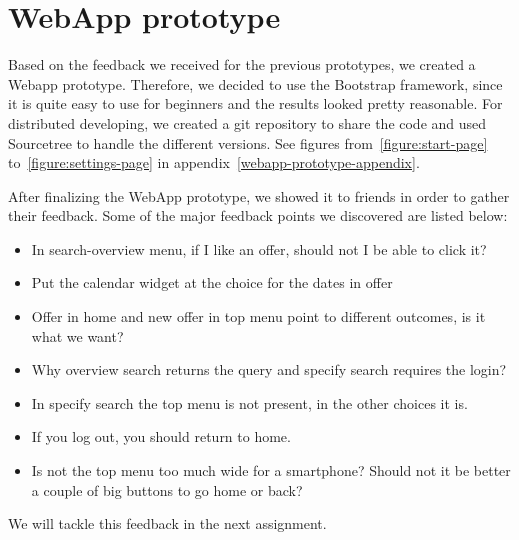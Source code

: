 \documentclass[11pt,twoside,a4paper]{report}
\begin{document}
\section{WebApp prototype}

Based on the feedback we received for the previous prototypes, we created a Webapp prototype. Therefore, we decided to use the Bootstrap framework, since it is quite easy to use for beginners and the results looked pretty reasonable. For distributed developing, we created a git repository to share the code and used Sourcetree to handle the different versions. See figures from~\ref{figure:start-page} to~\ref{figure:settings-page} in appendix~\ref{webapp-prototype-appendix}.

After finalizing the WebApp prototype, we showed it to friends in order to gather their feedback. Some of the major feedback points we discovered are listed below:

\begin{itemize}

\item In search-overview menu, if I like an offer, should not I be able to click it?

\item Put the calendar widget at the choice for the dates in offer

\item Offer in home and new offer in top menu point to different outcomes, is it what we want?

\item Why overview search returns the query and specify search requires the login?

\item In specify search the top menu is not present, in the other choices it is.

\item If you log out, you should return to home.

\item Is not the top menu too much wide for a smartphone? Should not it be better a couple of big buttons to go home or back?

\end{itemize}

We will tackle this feedback in the next assignment.
\end{document}
